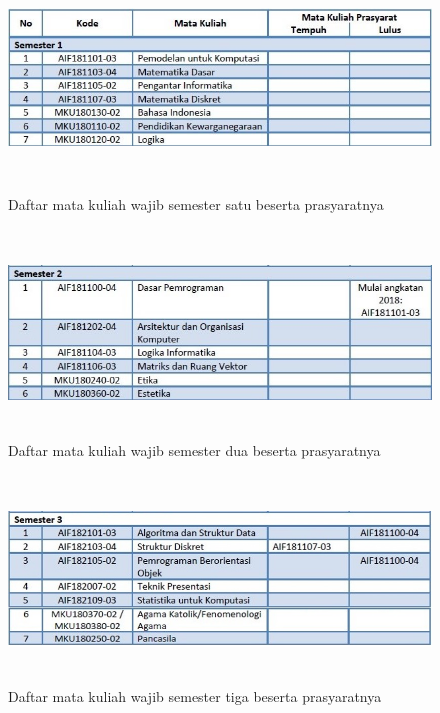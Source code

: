 \begin{figure}[H]
    \centering
    \includegraphics[width=12cm, height=6cm]{Gambar/Prasyarat MK Wajib Sem 1.jpg}
    \caption{Daftar mata kuliah wajib semester satu beserta prasyaratnya}
    \label{fig:gambarSem1}
\end{figure}

\begin{figure}[H]
    \centering
    \includegraphics[width=12cm, height=5.5cm]{Gambar/Prasyarat MK Wajib Sem 2.jpg}
    \caption{Daftar mata kuliah wajib semester dua beserta prasyaratnya}
    \label{fig:gambarSem2}
\end{figure}

\begin{figure}[H]
    \centering
    \includegraphics[width=12cm, height=5.5cm]{Gambar/Prasyarat MK Wajib Sem 3.jpg}
    \caption{Daftar mata kuliah wajib semester tiga beserta prasyaratnya}
    \label{fig:gambarSem3}
\end{figure}

